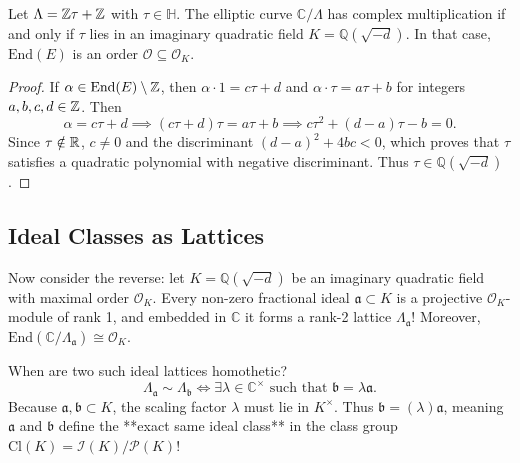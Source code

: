 \documentclass[a4paper]{article}
\begin{document}
\begin{theorem}
Let $\Lambda = \mathbb{Z}\tau + \mathbb{Z}$ with $\tau \in \mathbb{H}$. The elliptic curve $\mathbb{C}/\Lambda$ has complex multiplication if and only if $\tau$ lies in an imaginary quadratic field $K = \mathbb{Q}(\sqrt{-d})$. In that case, $\mathrm{End}(E)$ is an order $\mathcal{O} \subseteq \mathcal{O}_K$.
\end{theorem}
\begin{proof}
If $\alpha \in \mathrm{End}(E) \setminus \mathbb{Z}$, then $\alpha \cdot 1 = c\tau + d$ and $\alpha \cdot \tau = a\tau + b$ for integers $a, b, c, d \in \mathbb{Z}$. Then
\begin{equation}
 \alpha = c\tau + d \implies (c\tau + d)\tau = a\tau + b \implies c\tau^2 + (d - a)\tau - b = 0.
\end{equation}
Since $\tau \notin \mathbb{R}$, $c \ne 0$ and the discriminant $(d-a)^2 + 4bc < 0$, which proves that $\tau$ satisfies a quadratic polynomial with negative discriminant. Thus $\tau \in \mathbb{Q}(\sqrt{-d})$.
\end{proof}

\subsection{Ideal Classes as Lattices}
Now consider the reverse: let $K = \mathbb{Q}(\sqrt{-d})$ be an imaginary quadratic field with maximal order $\mathcal{O}_K$.
Every non-zero fractional ideal $\mathfrak{a} \subset K$ is a projective $\mathcal{O}_K$-module of rank 1, and embedded in $\mathbb{C}$ it forms a rank-2 lattice $\Lambda_{\mathfrak{a}}$!
Moreover, $\mathrm{End}(\mathbb{C}/\Lambda_{\mathfrak{a}}) \cong \mathcal{O}_K$.

When are two such ideal lattices homothetic?
\begin{equation}
 \Lambda_{\mathfrak{a}} \sim \Lambda_{\mathfrak{b}} \iff \exists \lambda \in \mathbb{C}^\times \text{ such that } \mathfrak{b} = \lambda \mathfrak{a}.
\end{equation}
Because $\mathfrak{a}, \mathfrak{b} \subset K$, the scaling factor $\lambda$ must lie in $K^\times$. Thus $\mathfrak{b} = (\lambda)\mathfrak{a}$, meaning $\mathfrak{a}$ and $\mathfrak{b}$ define the **exact same ideal class** in the class group $\mathrm{Cl}(K) = \mathcal{I}(K)/\mathcal{P}(K)$!
\end{document}
